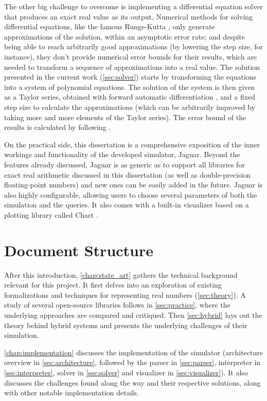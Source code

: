 The other big challenge to overcome is implementing a differential equation solver that produces an exact real value as its output. Numerical methods for solving differential equations, like the famous Runge-Kutta \cite{Butcher16}, only generate approximations of the solution, within an asymptotic error rate; and despite being able to reach arbitrarily good approximations (by lowering the step size, for instance), they don't provide numerical error bounds for their results, which are needed to transform a sequence of approximations into a real value. The solution presented in the current work (\cref{sec:solver}) starts by transforming the equations into a system of polynomial equations. The solution of the system is then given as a Taylor series, obtained with forward automatic differentiation \cite{Rall1981}, and a fixed step size to calculate the approximations (which can be arbitrarily improved by taking more and more elements of the Taylor series). The error bound of the results is calculated by following \cite{WARNE20061695}.

On the practical side, this dissertation is a comprehensive exposition of the inner workings and functionality of the developed simulator, Jaguar. Beyond the features already discussed, Jaguar is as generic as to support all libraries for exact real arithmetic discussed in this dissertation (as well as double-precision floating-point numbers) and new ones can be easily added in the future. Jaguar is also highly configurable, allowing users to choose several parameters of both the simulation and the queries. It also comes with a built-in visualizer based on a plotting library called Chart \cite{Chart}.

\section{Document Structure}

After this introduction, \cref{chap:state_art} gathers the technical background relevant for this project. It first delves into an exploration of existing formalizations and techniques for representing real numbers (\cref{sec:theory}). A study of several open-source libraries follows in \cref{sec:practice}, where the underlying approaches are compared and critiqued. Then \cref{sec:hybrid} lays out the theory behind hybrid systems and presents the underlying challenges of their simulation.

\cref{chap:implementation} discusses the implementation of the simulator (architecture overview in \cref{sec:architecture}, followed by the parser in \cref{sec:parser}, interpreter in \cref{sec:interpreter}, solver in \cref{sec:solver} and visualizer in \cref{sec:visualizer}). It also discusses the challenges found along the way and their respective solutions, along with other notable implementation details.

